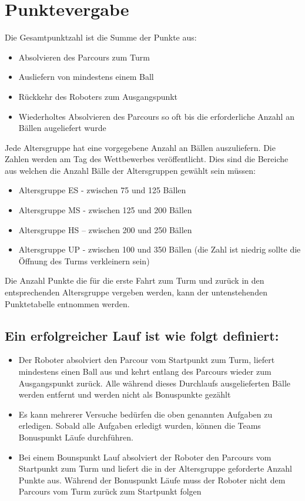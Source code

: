 \documentclass[a4paper,12pt]{article}
\begin{document}
\section{Punktevergabe}
Die Gesamtpunktzahl ist die Summe der Punkte aus:
\begin{itemize}
	\item Absolvieren des Parcours zum Turm
	\item Ausliefern von mindestens einem Ball
	\item Rückkehr des Roboters zum Ausgangspunkt
	\item Wiederholtes Absolvieren des Parcours so oft bis die
		erforderliche Anzahl an Bällen augeliefert wurde
\end{itemize}

Jede Altersgruppe hat eine vorgegebene Anzahl an Bällen auszuliefern. Die
Zahlen werden am Tag des Wettbewerbes veröffentlicht. Dies sind die Bereiche
aus welchen die Anzahl Bälle der Altersgruppen gewählt sein müssen:
\begin{itemize}
	\item Altersgruppe ES - zwischen 75 und 125 Bällen
	\item Altersgruppe MS - zwischen 125 und 200 Bällen
	\item Altersgruppe HS – zwischen 200 und 250 Bällen
	\item Altersgruppe UP - zwischen 100 und 350 Bällen (die Zahl ist
		niedrig sollte die Öffnung des Turms verkleinern sein)
\end{itemize}

Die Anzahl Punkte die für die erste Fahrt zum Turm und zurück in den
entsprechenden Altersgruppe vergeben werden, kann der untenstehenden
Punktetabelle entnommen werden.

\subsection{Ein erfolgreicher Lauf ist wie folgt definiert:}
\begin{itemize}
	\item Der Roboter absolviert den Parcour vom Startpunkt zum Turm,
		liefert mindestens einen Ball aus und kehrt entlang des
		Parcours wieder zum Ausgangspunkt zurück. Alle während dieses
		Durchlaufs ausgelieferten Bälle werden entfernt und werden
		nicht als Bonuspunkte gezählt
	\item Es kann mehrerer Versuche bedürfen die oben genannten Aufgaben zu
		erledigen. Sobald alle Aufgaben erledigt wurden, können die
		Teams Bonuspunkt Läufe durchführen.
	\item Bei einem Bounspunkt Lauf absolviert der Roboter den Parcours vom
		Startpunkt zum Turm und liefert die in der Altersgruppe
		geforderte Anzahl Punkte aus. Während der Bonuspunkt Läufe muss
		der Roboter nicht dem Parcours vom Turm zurück zum Startpunkt
		folgen
\end{itemize}
\end{document}
